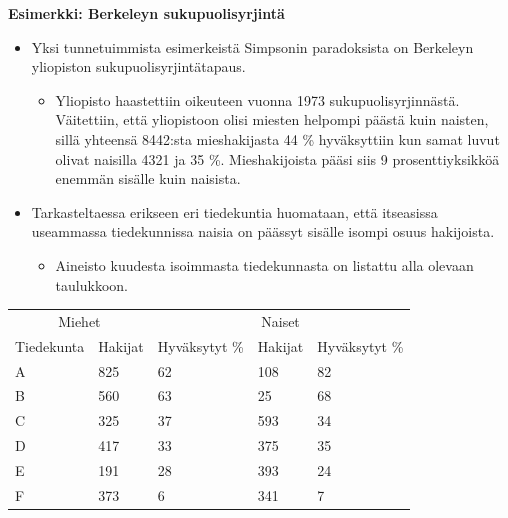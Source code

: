 \documentclass[
]{book}
\providecommand{\tightlist}{%
  \setlength{\itemsep}{0pt}\setlength{\parskip}{0pt}}
\begin{document}
\begin{defblock}{}

\textbf{Esimerkki: Berkeleyn sukupuolisyrjintä}

\begin{itemize}
\tightlist
\item
  Yksi tunnetuimmista esimerkeistä Simpsonin paradoksista on Berkeleyn yliopiston sukupuolisyrjintätapaus.

  \begin{itemize}
  \tightlist
  \item
    Yliopisto haastettiin oikeuteen vuonna 1973 sukupuolisyrjinnästä. Väitettiin, että yliopistoon olisi miesten helpompi päästä kuin naisten, sillä yhteensä 8442:sta mieshakijasta 44 \% hyväksyttiin kun samat luvut olivat naisilla 4321 ja 35 \%. Mieshakijoista pääsi siis 9 prosenttiyksikköä enemmän sisälle kuin naisista.
  \end{itemize}
\item
  Tarkasteltaessa erikseen eri tiedekuntia huomataan, että itseasissa useammassa tiedekunnissa naisia on päässyt sisälle isompi osuus hakijoista.

  \begin{itemize}
  \tightlist
  \item
    Aineisto kuudesta isoimmasta tiedekunnasta on listattu alla olevaan taulukkoon.
  \end{itemize}
\end{itemize}

\end{defblock}

\FloatBarrier

\begin{table}
\centering\begingroup\fontsize{12}{14}\selectfont

\begin{tabular}{lllll}
\toprule
\multicolumn{2}{c}{Miehet} & \multicolumn{3}{c}{Naiset} \\
\cmidrule(l{3pt}r{3pt}){1-2} \cmidrule(l{3pt}r{3pt}){3-5}
Tiedekunta & Hakijat & Hyväksytyt \% & Hakijat & Hyväksytyt \%\\
\midrule
A & 825 & 62 & 108 & 82\\
B & 560 & 63 & 25 & 68\\
C & 325 & 37 & 593 & 34\\
D & 417 & 33 & 375 & 35\\
E & 191 & 28 & 393 & 24\\
\addlinespace
F & 373 & 6 & 341 & 7\\
\bottomrule
\end{tabular}
\endgroup{}
\end{table}
\end{document}
